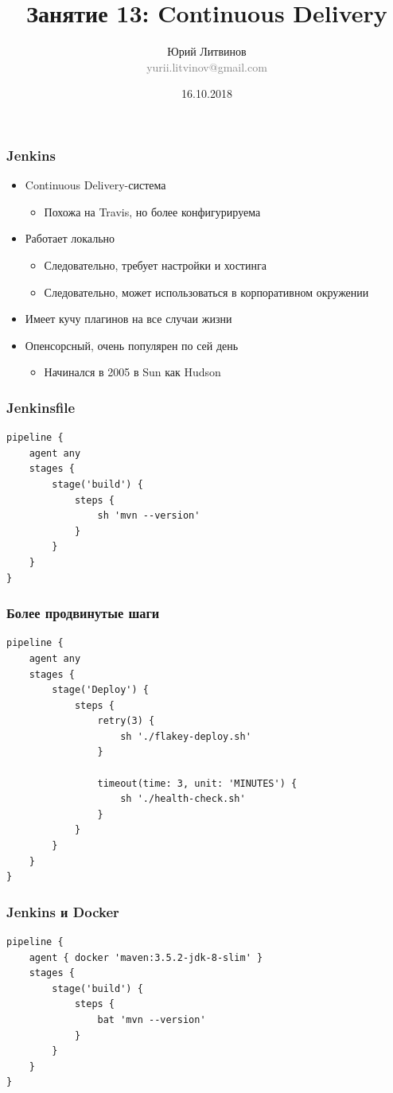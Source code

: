 \documentclass[xetex,mathserif,serif]{beamer}
\title{Занятие 13: Continuous Delivery}
\author[Юрий Литвинов]{Юрий Литвинов\\\small{\textcolor{gray}{yurii.litvinov@gmail.com}}}
\date{16.10.2018}
\begin{document}
	\frame{\titlepage}

	\begin{frame}
		\frametitle{Jenkins}
		\begin{itemize}
			\item Continuous Delivery-система
			\begin{itemize}
				\item Похожа на Travis, но более конфигурируема
			\end{itemize}
			\item Работает локально
			\begin{itemize}
				\item Следовательно, требует настройки и хостинга
				\item Следовательно, может использоваться в корпоративном окружении
			\end{itemize}
			\item Имеет кучу плагинов на все случаи жизни
			\item Опенсорсный, очень популярен по сей день
			\begin{itemize}
				\item Начинался в 2005 в Sun как Hudson
			\end{itemize}
		\end{itemize}
	\end{frame}

	\begin{frame}[fragile]
		\frametitle{Jenkinsfile}
		\begin{verbatim}
pipeline {
    agent any
    stages {
        stage('build') {
            steps {
                sh 'mvn --version'
            }
        }
    }
}
		\end{verbatim}
	\end{frame}

	\begin{frame}[fragile]
		\frametitle{Более продвинутые шаги}
		\begin{verbatim}
pipeline {
    agent any
    stages {
        stage('Deploy') {
            steps {
                retry(3) {
                    sh './flakey-deploy.sh'
                }

                timeout(time: 3, unit: 'MINUTES') {
                    sh './health-check.sh'
                }
            }
        }
    }
}
		\end{verbatim}
	\end{frame}

	\begin{frame}[fragile]
		\frametitle{Jenkins и Docker}
		\begin{verbatim}
pipeline {
    agent { docker 'maven:3.5.2-jdk-8-slim' }
    stages {
        stage('build') {
            steps {
                bat 'mvn --version'
            }
        }
    }
}
		\end{verbatim}
	\end{frame}
\end{document}

